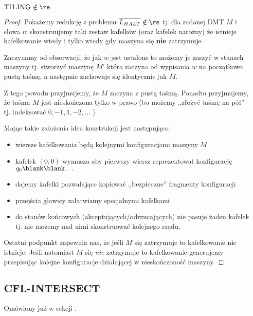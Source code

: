 \begin{theorem}
    \( \textsc{TILING} \notin \re \)
\end{theorem}
\begin{proof}
    Pokażemy redukcję z problemu \( \overline{L_{HALT}} \notin \re \) tj. dla zadanej DMT \( M \) i słowa \( w \) skonstruujemy taki zestaw kafelków (oraz kafelek narożny) że istnieje kafelkowanie wtedy i tylko wtedy gdy maszyna się \textbf{nie} zatrzymuje.
    
    Zaczynamy od obserwacji, że jak \( w \) jest ustalone to możemy je zaszyć w stanach maszyny tj. stworzyć maszynę \( M' \) która zaczyna od wypisania \( w \) na początkowo pustą taśmę, a następnie zachowuje się identycznie jak \( M \). 
    
    Z tego powodu przyjmujemy, że \( M \) zaczyna z pustą taśmą. Ponadto przyjmujemy, że taśma \( M \) jest nieskończona tylko w prawo (bo możemy ,,złożyć taśmę na pół'' tj. indeksować \( 0, -1, 1, -2, \dots \) )
    
    Mając takie założenia idea konstrukcji jest następująca:
    \begin{itemize}
        \item wiersze kafelkowania będą kolejnymi konfiguracjami maszyny \( M \)
        \item kafelek \( (0, 0) \) wymusza aby pierwszy wiersz reprezentował konfigurację \( q_0 \blank \blank \dots \)
        \item dajemy kafelki pozwalające kopiować ,,bezpieczne'' fragmenty konfiguracji
        \item przejścia głowicy załatwiamy specjalnymi kafelkami
        \item do stanów końcowych (akceptujących/odrzucających) nie pasuje żaden kafelek tj. nie możemy nad nimi skonstruować kolejnego rzędu.
    \end{itemize}
    
    Ostatni podpunkt zapewnia nas, że jeśli \( M \) się zatrzymuje to kafelkowanie nie istnieje.
    Jeśli natomiast \( M \) się \textit{nie} zatrzymuje to kafelkowanie generujemy przepisując kolejne konfiguracje działającej w nieskończoność maszyny.
    
\end{proof}

\subsection{CFL-INTERSECT}

Omówiony już w sekcji .